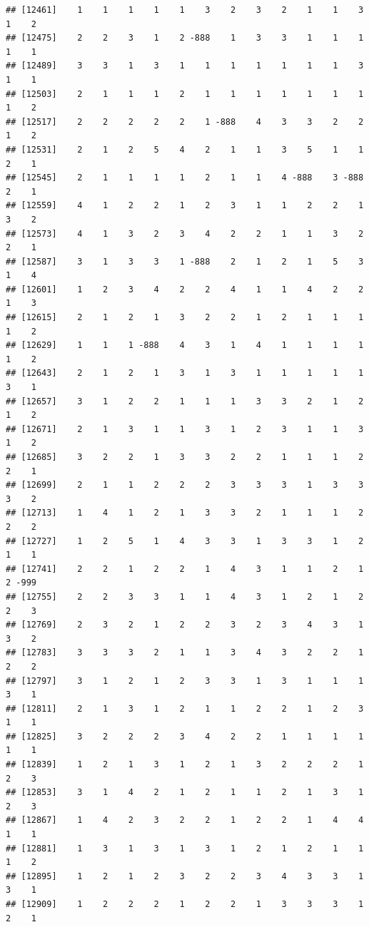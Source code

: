 \documentclass[
  12pt,
  openany]{book}
\begin{document}
\begin{verbatim}
## [12461]    1    1    1    1    1    3    2    3    2    1    1    3    1    2
## [12475]    2    2    3    1    2 -888    1    3    3    1    1    1    1    1
## [12489]    3    3    1    3    1    1    1    1    1    1    1    3    1    1
## [12503]    2    1    1    1    2    1    1    1    1    1    1    1    1    2
## [12517]    2    2    2    2    2    1 -888    4    3    3    2    2    1    2
## [12531]    2    1    2    5    4    2    1    1    3    5    1    1    2    1
## [12545]    2    1    1    1    1    2    1    1    4 -888    3 -888    2    1
## [12559]    4    1    2    2    1    2    3    1    1    2    2    1    3    2
## [12573]    4    1    3    2    3    4    2    2    1    1    3    2    2    1
## [12587]    3    1    3    3    1 -888    2    1    2    1    5    3    1    4
## [12601]    1    2    3    4    2    2    4    1    1    4    2    2    1    3
## [12615]    2    1    2    1    3    2    2    1    2    1    1    1    1    2
## [12629]    1    1    1 -888    4    3    1    4    1    1    1    1    1    2
## [12643]    2    1    2    1    3    1    3    1    1    1    1    1    3    1
## [12657]    3    1    2    2    1    1    1    3    3    2    1    2    1    2
## [12671]    2    1    3    1    1    3    1    2    3    1    1    3    1    2
## [12685]    3    2    2    1    3    3    2    2    1    1    1    2    2    1
## [12699]    2    1    1    2    2    2    3    3    3    1    3    3    3    2
## [12713]    1    4    1    2    1    3    3    2    1    1    1    2    2    2
## [12727]    1    2    5    1    4    3    3    1    3    3    1    2    1    1
## [12741]    2    2    1    2    2    1    4    3    1    1    2    1    2 -999
## [12755]    2    2    3    3    1    1    4    3    1    2    1    2    2    3
## [12769]    2    3    2    1    2    2    3    2    3    4    3    1    3    2
## [12783]    3    3    3    2    1    1    3    4    3    2    2    1    2    2
## [12797]    3    1    2    1    2    3    3    1    3    1    1    1    3    1
## [12811]    2    1    3    1    2    1    1    2    2    1    2    3    1    1
## [12825]    3    2    2    2    3    4    2    2    1    1    1    1    1    1
## [12839]    1    2    1    3    1    2    1    3    2    2    2    1    2    3
## [12853]    3    1    4    2    1    2    1    1    2    1    3    1    2    3
## [12867]    1    4    2    3    2    2    1    2    2    1    4    4    1    1
## [12881]    1    3    1    3    1    3    1    2    1    2    1    1    1    2
## [12895]    1    2    1    2    3    2    2    3    4    3    3    1    3    1
## [12909]    1    2    2    2    1    2    2    1    3    3    3    1    2    1

\end{verbatim}
\end{document}
